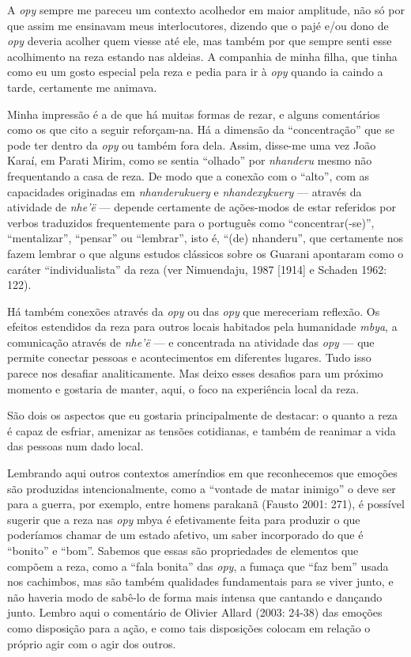 A \emph{opy} sempre me pareceu um contexto acolhedor em maior amplitude, não só
por que assim me ensinavam meus interlocutores, dizendo que o pajé e/ou
dono de \emph{opy} deveria acolher quem viesse até ele, mas também por que
sempre senti esse acolhimento na reza estando nas aldeias. A companhia
de minha filha, que tinha como eu um gosto especial pela reza e pedia
para ir à \emph{opy} quando ia caindo a tarde, certamente me animava.

Minha impressão é a de que há muitas formas de rezar, e alguns
comentários como os que cito a seguir reforçam-na. Há a dimensão da
``concentração'' que se pode ter dentro da \emph{opy} ou também fora dela.
Assim, disse-me uma vez João Karaí, em Parati Mirim, como se sentia
``olhado'' por \emph{nhanderu} mesmo não frequentando a casa de reza. De modo que
a conexão com o ``alto'', com as capacidades originadas em \emph{nhanderukuery} e
\emph{nhandexykuery} --- através da atividade de \emph{nhe’ë} --- depende certamente de
ações-modos de estar referidos por verbos traduzidos frequentemente
para o português como ``concentrar(-se)'',  ``mentalizar'', ``pensar'' ou
``lembrar'', isto é, ``(de) nhanderu'', que certamente nos fazem lembrar o
que alguns estudos clássicos sobre os Guarani apontaram como o caráter
``individualista'' da reza (ver Nimuendaju, 1987 [1914] e Schaden 1962:
122). 

Há também conexões através da \emph{opy} ou das \emph{opy} que mereceriam reflexão. Os
efeitos estendidos da reza para outros locais habitados pela humanidade
\emph{mbya}, a comunicação através de \emph{nhe’ë} --- e concentrada na atividade das
\emph{opy} --- que permite conectar pessoas e acontecimentos em diferentes
lugares. Tudo isso parece nos desafiar analiticamente. Mas deixo esses
desafios para um próximo momento e gostaria de manter, aqui, o foco na
experiência local da reza.

São dois os aspectos que eu gostaria principalmente de destacar: o
quanto a reza é capaz de esfriar, amenizar as tensões cotidianas, e
também de reanimar a vida das pessoas num dado local.

Lembrando aqui outros contextos ameríndios em que reconhecemos que
emoções são produzidas intencionalmente, como a ``vontade de matar
inimigo'' o deve ser para a guerra, por exemplo, entre homens parakanã
(Fausto 2001: 271), é possível sugerir que a reza nas \emph{opy} mbya é
efetivamente feita para produzir o que poderíamos chamar de um estado
afetivo, um saber incorporado do que é ``bonito'' e ``bom''. Sabemos que essas
são propriedades de elementos que compõem a reza, como a ``fala bonita''
das \emph{opy}, a fumaça que ``faz bem'' usada nos cachimbos, mas são também
qualidades fundamentais para se viver junto, e não haveria modo de
sabê-lo de forma mais intensa que cantando e dançando junto. Lembro
aqui o comentário de Olivier Allard (2003: 24-38) das emoções como
disposição para a ação, e como tais disposições colocam em relação o
próprio agir com o agir dos outros.

